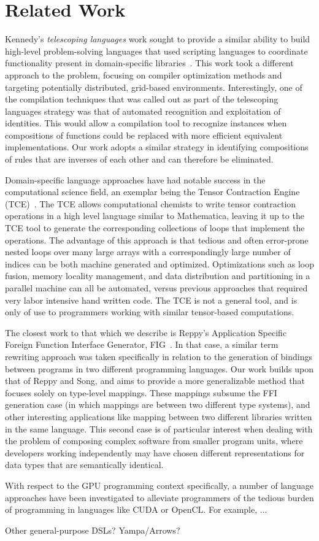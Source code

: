 
\section{Related Work}

Kennedy's \emph{telescoping languages} work sought to provide a similar ability
to build high-level problem-solving languages that used scripting languages to
coordinate functionality present in domain-specific
libraries~\cite{kennedy00telescoping}. This work took a different approach to
the problem, focusing on compiler optimization methods and targeting potentially
distributed, grid-based environments. Interestingly, one of the compilation
techniques that was called out as part of the telescoping languages strategy was
that of automated recognition and exploitation of identities. This would allow a
compilation tool to recognize instances when compositions of functions could be
replaced with more efficient equivalent implementations. Our work adopts a
similar strategy in identifying compositions of rules that are inverses of each
other and can therefore be eliminated.

Domain-specific language approaches have had notable success in the
computational science field, an exemplar being the Tensor Contraction Engine
(TCE)~\cite{baumgartner05synthesis}. The TCE allows computational chemists to
write tensor contraction operations in a high level language similar to
Mathematica, leaving it up to the TCE tool to generate the corresponding
collections of loops that implement the operations. The advantage of this
approach is that tedious and often error-prone nested loops over many large
arrays with a correspondingly large number of indices can be both machine
generated and optimized. Optimizations such as loop fusion, memory locality
management, and data distribution and partitioning in a parallel machine can all
be automated, versus previous approaches that required very labor intensive hand
written code. The TCE is not a general tool, and is only of use to programmers
working with similar tensor-based computations.

The closest work to that which we describe is Reppy's Application Specific
Foreign Function Interface Generator, FIG~\cite{reppy06fig}. In that case, a
similar term rewriting approach was taken specifically in relation to the
generation of bindings between programs in two different programming languages.
Our work builds upon that of Reppy and Song, and aims to provide a more
generalizable method that focuses solely on type-level mappings. These mappings
subsume the FFI generation case (in which mappings are between two different
type systems), and other interesting applications like mapping between two
different libraries written in the same language. This second case is of
particular interest when dealing with the problem of composing complex software
from smaller program units, where developers working independently may have
chosen different representations for data types that are semantically identical.

With respect to the GPU programming context specifically, a number of language
approaches have been investigated to alleviate programmers of the tedious burden
of programming in languages like CUDA or OpenCL. For example, ...

Other general-purpose DSLs? Yampa/Arrows?

